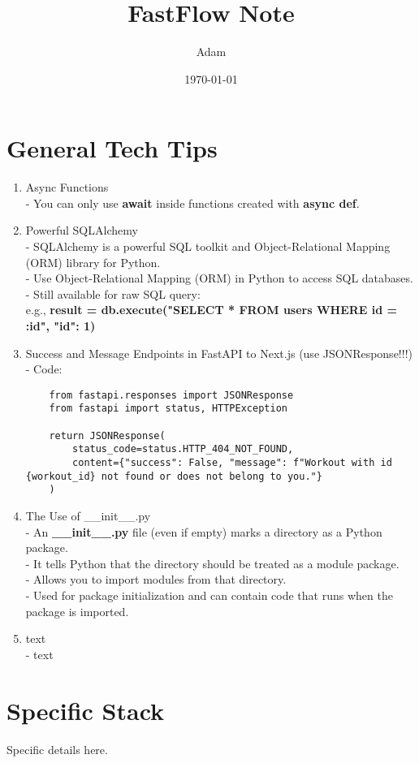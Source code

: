 \documentclass[12pt]{article}
\title{FastFlow Note}
\author{Adam}
\date{\today}
\begin{document}
\maketitle

\section{General Tech Tips}
\begin{enumerate}
    \item \large{Async Functions}
    \\- You can only use \textbf{await} inside functions created with \textbf{async def}.

    \item \large{Powerful SQLAlchemy}
    \\- SQLAlchemy is a powerful SQL toolkit and Object-Relational Mapping (ORM) library for Python.
    \\- Use Object-Relational Mapping (ORM) in Python to access SQL databases.
    \\- Still available for raw SQL query: 
    \\e.g., \textbf{result = db.execute("SELECT * FROM users WHERE id = :id", {"id": 1})}

    \item \large{Success and Message Endpoints in FastAPI to Next.js (use JSONResponse!!!)}
    \\- Code:
    \begin{verbatim}
    from fastapi.responses import JSONResponse
    from fastapi import status, HTTPException

    return JSONResponse(
        status_code=status.HTTP_404_NOT_FOUND,
        content={"success": False, "message": f"Workout with id {workout_id} not found or does not belong to you."}
    )
    \end{verbatim}

    \item \large{The Use of \_\_init\_\_.py}
    \\- An \textbf{\_\_init\_\_.py} file (even if empty) marks a directory as a Python package.
    \\- It tells Python that the directory should be treated as a module package.
    \\- Allows you to import modules from that directory.
    \\- Used for package initialization and can contain code that runs when the package is imported.

    \item \large{text}
    \\- text

\end{enumerate}

\section{Specific Stack}
Specific details here.
\end{document}
